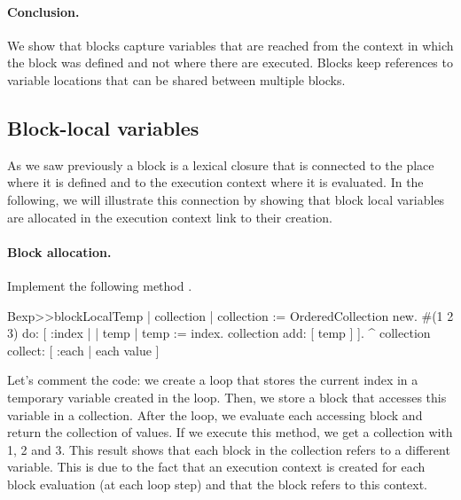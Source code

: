 \documentclass[a4paper,10pt,twoside]{book}
\begin{document}
\paragraph{Conclusion.} We show that blocks capture variables that are reached from the context in which the block was defined and not where there are executed. Blocks keep references to variable locations that can be shared between multiple blocks. 


\subsection{Block-local variables}

As we saw previously a block is a lexical closure that is connected to the place where it is defined and to the execution context where it is evaluated. In the following, we will illustrate this connection by showing that block local variables are allocated in the execution context link to their creation.

\paragraph{Block allocation.} Implement the following method .

\begin{code}{}
Bexp>>blockLocalTemp
	| collection |
	collection := OrderedCollection new.
	#(1 2 3) do: [ :index |
		| temp |
		temp := index.
		collection add: [ temp ] ].
	^ collection collect: [ :each | each value ]
\end{code}

Let's comment the code: we create a loop that stores the current index in a temporary variable  created in the loop. Then, we store a block that accesses this variable in a collection. After the loop, we evaluate each accessing block and return the collection of values. If we execute this method, we get a collection with 1, 2 and 3. This result shows that each block in the collection refers to a different  variable.
This is due to the fact that an execution context is created for each block evaluation (at each loop step) and that the block \ct{[ temp ]} refers to this context.
\end{document}

